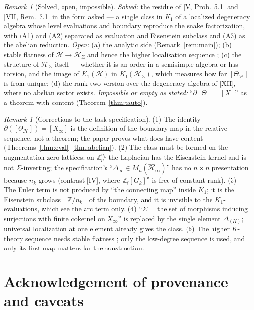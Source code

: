 \documentclass[11pt]{amsart}
\numberwithin{equation}{section}
\theoremstyle{definition}
\theoremstyle{remark}
\newtheorem{remark}[theorem]{Remark}
\newcommand{\Z}{\mathbb{Z}}
\newcommand{\Zp}{\Z_p}
\newcommand{\Zl}{\Z_\ell}
\newcommand{\cH}{\mathcal{H}}
\newcommand{\HS}{\cH_\Sigma}
\begin{document}
\begin{remark}[Solved, open, impossible]\label{rem:scope}
\emph{Solved:} the residue of [V, Prob.~5.1] and [VII, Rem.~3.1] in the form asked --- a single
class in $K_1$ of a localized degeneracy algebra whose level evaluations and boundary
reproduce the snake factorization, with (A1) and (A2) separated as evaluation and Eisenstein
subclass and (A3) as the abelian reduction. \emph{Open:} (a) the analytic side
(Remark~\ref{rem:main}); (b) stable flatness of $\cH\to\HS$ and hence the higher localization
sequence \cite{NR}; (c) the structure of $\HS$ itself --- whether it is an order in a
semisimple algebra or has torsion, and the image of $K_1(\cH)$ in $K_1(\HS)$, which
measures how far $[\Theta_{\cH}]$ is from unique; (d) the rank-two version over the
degeneracy algebra of [XII], where no abelian sector exists. \emph{Impossible or empty as
stated:} ``$\partial[\Theta]=[X]$'' as a theorem with content (Theorem~\ref{thm:tauto}).
\end{remark}

\begin{remark}[Corrections to the task specification]\label{rem:corrections}
(1) The identity $\partial([\Theta_{\cH}])=[X_\infty]$ is the definition of the boundary map in
the relative sequence, not a theorem; the paper proves what does have content
(Theorems~\ref{thm:eval}--\ref{thm:abelian}). (2) The class must be formed on the
augmentation-zero lattices: on $\Zp^{n_k}$ the Laplacian has the Eisenstein kernel and is not
$\Sigma$-inverting; the specification's ``$\Delta_\infty\in M_n(\widehat{\cH}_\infty)$'' has no
$n\times n$ presentation because $n_k$ grows (contrast [IV], where $\Zl[G_k]^{n}$ is free of
constant rank). (3) The Euler term is not produced by ``the connecting map'' inside $K_1$;
it is the Eisenstein subclass $[\Z/n_k]$ of the boundary, and it is invisible to the
$K_1$-evaluations, which see the arc term only. (4) ``$\Sigma$ = the set of morphisms
inducing surjections with finite cokernel on $X_\infty$'' is replaced by the single element
$\Delta_{(K)}$; universal localization at one element already gives the class. (5) The
higher $K$-theory sequence needs stable flatness \cite{NR}; only the low-degree sequence
\cite{Sch} is used, and only its first map matters for the construction.
\end{remark}

\section*{Acknowledgement of provenance and caveats}
\end{document}
